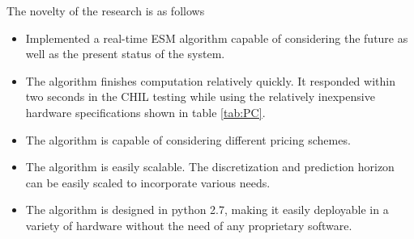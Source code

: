 The novelty of the research is as follows
\begin{itemize}
    \item Implemented a real-time ESM algorithm capable of considering the future as well as the present status of the system.
    \item The algorithm finishes computation relatively quickly. It responded within two seconds in the CHIL testing while using the relatively inexpensive hardware specifications shown in table \ref{tab:PC}.
    \item The algorithm is capable of considering different pricing schemes.
    \item The algorithm is easily scalable. The discretization and prediction horizon can be easily scaled to incorporate various needs.
    \item The algorithm is designed in python 2.7, making it easily deployable in a variety of hardware without the need of any proprietary software.
\end{itemize}
